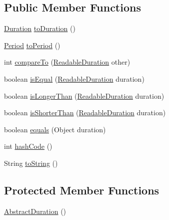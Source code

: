 \subsection*{Public Member Functions}
\begin{DoxyCompactItemize}
\item 
\hyperlink{classorg_1_1joda_1_1time_1_1_duration}{Duration} \hyperlink{classorg_1_1joda_1_1time_1_1base_1_1_abstract_duration_ab859c557bfca58343f5385152e9b121d}{to\-Duration} ()
\item 
\hyperlink{classorg_1_1joda_1_1time_1_1_period}{Period} \hyperlink{classorg_1_1joda_1_1time_1_1base_1_1_abstract_duration_a00b8d18be67e5ab6ee1b7c4e09c18a0b}{to\-Period} ()
\item 
int \hyperlink{classorg_1_1joda_1_1time_1_1base_1_1_abstract_duration_a9f7451131d6acf7b9077e842d13b6ad2}{compare\-To} (\hyperlink{interfaceorg_1_1joda_1_1time_1_1_readable_duration}{Readable\-Duration} other)
\item 
boolean \hyperlink{classorg_1_1joda_1_1time_1_1base_1_1_abstract_duration_ab0dcedee5c2bafdb0347767c81040e5f}{is\-Equal} (\hyperlink{interfaceorg_1_1joda_1_1time_1_1_readable_duration}{Readable\-Duration} duration)
\item 
boolean \hyperlink{classorg_1_1joda_1_1time_1_1base_1_1_abstract_duration_a175ccb790453567b37ee6fcb9b94a3e4}{is\-Longer\-Than} (\hyperlink{interfaceorg_1_1joda_1_1time_1_1_readable_duration}{Readable\-Duration} duration)
\item 
boolean \hyperlink{classorg_1_1joda_1_1time_1_1base_1_1_abstract_duration_a9c99846153aeee1a3ff75d5ab0b1b36e}{is\-Shorter\-Than} (\hyperlink{interfaceorg_1_1joda_1_1time_1_1_readable_duration}{Readable\-Duration} duration)
\item 
boolean \hyperlink{classorg_1_1joda_1_1time_1_1base_1_1_abstract_duration_a98a282d59cdf77010e7dce5cea3edaed}{equals} (Object duration)
\item 
int \hyperlink{classorg_1_1joda_1_1time_1_1base_1_1_abstract_duration_ac2cca04ed3ee1a15de31f38e9894a774}{hash\-Code} ()
\item 
String \hyperlink{classorg_1_1joda_1_1time_1_1base_1_1_abstract_duration_ad07cd3a237d62216c1b2196ae79c4d1b}{to\-String} ()
\end{DoxyCompactItemize}
\subsection*{Protected Member Functions}
\begin{DoxyCompactItemize}
\item 
\hyperlink{classorg_1_1joda_1_1time_1_1base_1_1_abstract_duration_a7096ec2abf0f068c17cc8d74668972ff}{Abstract\-Duration} ()
\end{DoxyCompactItemize}


